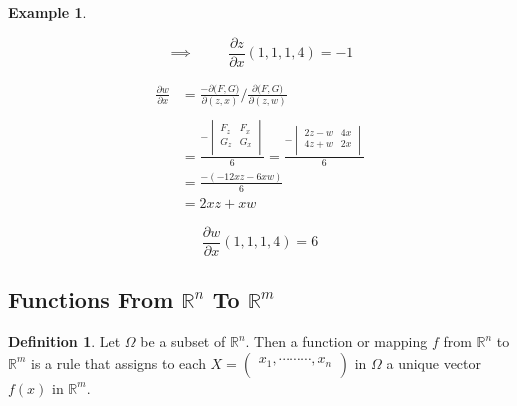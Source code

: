 \documentclass[11pt,a4paper]{article}
\theoremstyle{definition}
\newtheorem{defn}[thm]{Definition}
\newtheorem{exa}[thm]{Example}
\begin{document}
\begin{exa}
\begin{enumerate}
$$\implies \hspace{1cm} \frac{\partial z}{\partial x}(1,1,1,4) = -1$$

\begin{align*}
\frac{\partial w}{\partial x} & = \frac{- \partial \big(F,G\big)}{\partial (z,x)}\Bigg/ \frac{\partial \big(F,G\big)}{\partial (z,w)}\\\\
& = \frac{-\begin{vmatrix}
F_z & F_x\\
G_z & G_x\\
\end{vmatrix}
}{6} = \frac{-
\begin{vmatrix}
2z-w & 4x\\
4z + w & 2x\\
\end{vmatrix}
}{6}\\
& = \frac{-(-12xz -6xw)}{6}\\
& = 2xz + xw
\end{align*}

$$\frac{\partial w}{\partial x}(1,1,1,4) =6$$

\end{enumerate}
\end{exa}

{\color[wave]{485}\subsection{Functions From $\mathbb{R}^n$ To $\mathbb{R}^m$}}

\begin{defn}


Let $\Omega$ be a subset of $\mathbb{R}^n$. Then a function or mapping $f$ from $\mathbb{R}^n$ to $\mathbb{R}^m$ is a rule that assigns to each $X =
\begin{pmatrix}
x_1, \cdots\cdots\cdots, x_n\\
\end{pmatrix}$ in $\Omega$ a unique vector $f(x)$ in $\mathbb{R}^m$.\\
\end{defn}
\end{document}
